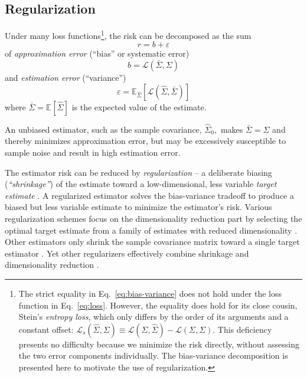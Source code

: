 \documentclass[10pt]{article}
\newcommand{\loss}[1]{\mathcal L\left(#1\right)}
\newcommand{\E}[2][]{\mathbb E_{#1}\left[ #2\right]}    %
\begin{document}
\subsection*{Regularization}
Under many loss functions\footnote{
The strict equality in Eq.~\ref{eq:bias-variance} does not hold under the loss function in Eq.~\ref{eq:loss}. 
However, the equality does hold for its close cousin, Stein's \emph{entropy loss}, which only differs by the order of its arguments and a constant offset: $\mathcal L_s(\hat\Sigma,\Sigma) \equiv \loss{\Sigma,\hat\Sigma} - \loss{\Sigma,\Sigma}$. 
This deficiency presents no difficulty because we minimize the risk directly, without assessing the two error components individually. 
The bias-variance decomposition is presented here to motivate the use of regularization.}, 
the risk can be decomposed as the sum
\begin{equation}\label{eq:bias-variance}
    r = b + \varepsilon
\end{equation}
of \emph{approximation error} (``bias'' or systematic error)
\begin{equation}
   b = \loss{\bar\Sigma,\Sigma}
\end{equation}
and \emph{estimation error} (``variance'') 
\begin{equation}
   \varepsilon = \E[\hat\Sigma]{\loss{\hat\Sigma, \bar\Sigma}}
\end{equation}
where $\bar\Sigma = \E{\hat\Sigma}$ is the expected value of the estimate. 

An unbiased estimator, such as the sample covariance,  $\hat\Sigma_0,$ makes $\bar\Sigma=\Sigma$ and thereby minimizes approximation error, but may be excessively susceptible to sample noise and result in high estimation error.

The estimator risk can be reduced by \emph{regularization} -- a deliberate biasing (\emph{``shrinkage''}) of the estimate toward a low-dimensional, less variable \emph{target estimate} \cite{Bickel:2006,Ledoit:2004}. 
A regularized estimator solves the bias-variance tradeoff to produce a biased but less variable estimate to minimize the estimator's risk.  
Various regularization schemes focus on the dimensionality reduction part  by selecting the optimal target estimate from a family of estimates with reduced dimensionality \cite{findit}.  
Other estimators only shrink the sample covariance matrix toward a single target estimator \cite{Schafer:2005}. 
Yet other regularizers effectively combine shrinkage and dimensionality reduction \cite{findit}.
\end{document}
